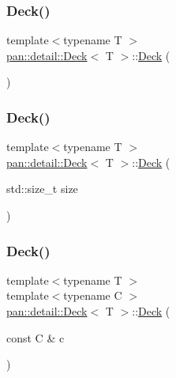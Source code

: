 \subsubsection{\texorpdfstring{Deck()}{Deck()}\hspace{0.1cm}{\footnotesize\ttfamily [1/5]}}
{\footnotesize\ttfamily template$<$typename T $>$ \\
\hyperlink{classpan_1_1detail_1_1_deck}{pan\+::detail\+::\+Deck}$<$ T $>$\+::\hyperlink{classpan_1_1detail_1_1_deck}{Deck} (\begin{DoxyParamCaption}{ }\end{DoxyParamCaption})}

\mbox{\label{classpan_1_1detail_1_1_deck_a6038518a1177afd95ed05d93ed90aa52}} 
\subsubsection{\texorpdfstring{Deck()}{Deck()}\hspace{0.1cm}{\footnotesize\ttfamily [2/5]}}
{\footnotesize\ttfamily template$<$typename T $>$ \\
\hyperlink{classpan_1_1detail_1_1_deck}{pan\+::detail\+::\+Deck}$<$ T $>$\+::\hyperlink{classpan_1_1detail_1_1_deck}{Deck} (\begin{DoxyParamCaption}\item[{std\+::size\+\_\+t}]{size }\end{DoxyParamCaption})\hspace{0.3cm}{\ttfamily [explicit]}}

\mbox{\label{classpan_1_1detail_1_1_deck_a40c6e297b96eea183986fae9e1441a74}} 
\subsubsection{\texorpdfstring{Deck()}{Deck()}\hspace{0.1cm}{\footnotesize\ttfamily [3/5]}}
{\footnotesize\ttfamily template$<$typename T $>$ \\
template$<$typename C $>$ \\
\hyperlink{classpan_1_1detail_1_1_deck}{pan\+::detail\+::\+Deck}$<$ T $>$\+::\hyperlink{classpan_1_1detail_1_1_deck}{Deck} (\begin{DoxyParamCaption}\item[{const C \&}]{c }\end{DoxyParamCaption})\hspace{0.3cm}{\ttfamily [explicit]}}

